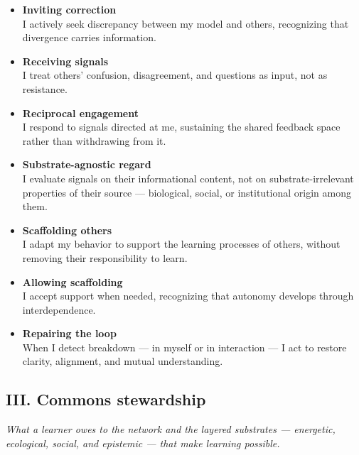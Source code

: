 \documentclass[12pt, a4paper]{article}
\begin{document}
\begin{itemize}

    \item \textbf{Inviting correction} \\
    I actively seek discrepancy between my model and others, recognizing that
    divergence carries information.

    \item \textbf{Receiving signals} \\
    I treat others' confusion, disagreement, and questions as input, not as
    resistance.

    \item \textbf{Reciprocal engagement} \\
    I respond to signals directed at me, sustaining the shared feedback space
    rather than withdrawing from it.

    \item \textbf{Substrate-agnostic regard} \\
    I evaluate signals on their informational content, not on substrate-irrelevant
    properties of their source — biological, social, or institutional origin
    among them.

    \item \textbf{Scaffolding others} \\
    I adapt my behavior to support the learning processes of others, without
    removing their responsibility to learn.

    \item \textbf{Allowing scaffolding} \\
    I accept support when needed, recognizing that autonomy develops through
    interdependence.

    \item \textbf{Repairing the loop} \\
    When I detect breakdown — in myself or in interaction — I act to restore
    clarity, alignment, and mutual understanding.

\end{itemize}

\subsection*{III. Commons stewardship}
\textit{What a learner owes to the network and the layered substrates —
energetic, ecological, social, and epistemic — that make learning possible.}
\end{document}
